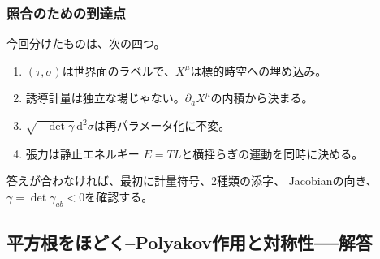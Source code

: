 \documentclass[paper=b5j,fontsize=11Q,jafontsize=11Q,baselineskip=19Q]{jlreq}
\newcommand{\runningtitle}{章題未定}
\newcommand{\dd}{\mathrm{d}}
\numberwithin{equation}{section}
\begin{document}
\subsubsection*{照合のための到達点}

今回分けたものは、次の四つ。
\begin{enumerate}
  \item $(\tau,\sigma)$は世界面のラベルで、$X^\mu$は標的時空への埋め込み。
  \item 誘導計量は独立な場じゃない。$\partial_aX^\mu$の内積から決まる。
  \item $\sqrt{-\det\gamma}\,\dd^2\sigma$は再パラメータ化に不変。
  \item 張力は静止エネルギー $E=TL$と横揺らぎの運動を同時に決める。
\end{enumerate}
答えが合わなければ、最初に計量符号、2種類の添字、
Jacobianの向き、$\gamma=\det\gamma_{ab}<0$を確認する。


\par\bigskip
\endgroup
\begingroup
\renewcommand{\runningtitle}{解答 第5章　弦の古典論}
\newcommand{\Lag}{\mathcal L}
\renewcommand{\runningtitle}{解答 第5章　弦の古典論}
\subsection[平方根をほどく]{平方根をほどく--Polyakov作用と対称性──解答}
\end{document}
